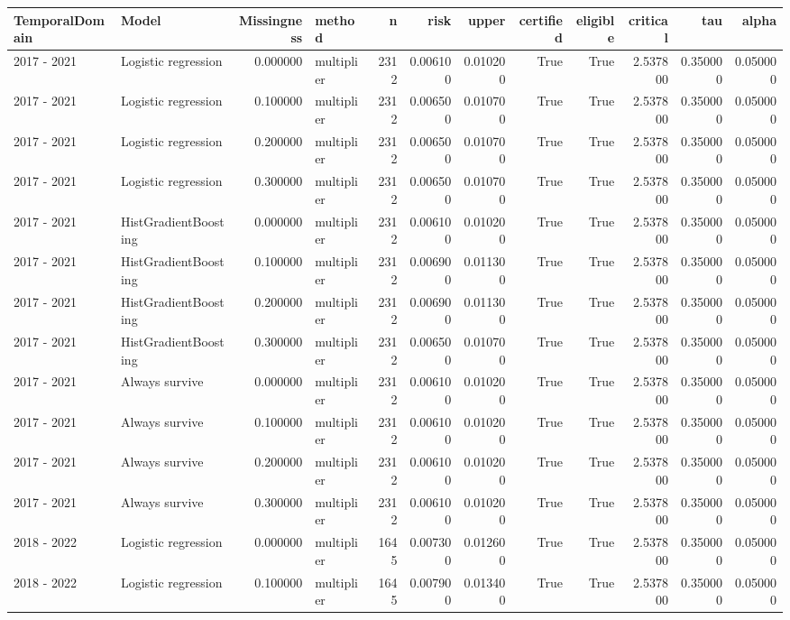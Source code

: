 \begin{tabular}{llrlrrrrrrrr}
\toprule
TemporalDomain & Model & Missingness & method & n & risk & upper & certified & eligible & critical & tau & alpha \\
\midrule
2017 - 2021 & Logistic regression & 0.000000 & multiplier & 2312 & 0.006100 & 0.010200 & True & True & 2.537800 & 0.350000 & 0.050000 \\
2017 - 2021 & Logistic regression & 0.100000 & multiplier & 2312 & 0.006500 & 0.010700 & True & True & 2.537800 & 0.350000 & 0.050000 \\
2017 - 2021 & Logistic regression & 0.200000 & multiplier & 2312 & 0.006500 & 0.010700 & True & True & 2.537800 & 0.350000 & 0.050000 \\
2017 - 2021 & Logistic regression & 0.300000 & multiplier & 2312 & 0.006500 & 0.010700 & True & True & 2.537800 & 0.350000 & 0.050000 \\
2017 - 2021 & HistGradientBoosting & 0.000000 & multiplier & 2312 & 0.006100 & 0.010200 & True & True & 2.537800 & 0.350000 & 0.050000 \\
2017 - 2021 & HistGradientBoosting & 0.100000 & multiplier & 2312 & 0.006900 & 0.011300 & True & True & 2.537800 & 0.350000 & 0.050000 \\
2017 - 2021 & HistGradientBoosting & 0.200000 & multiplier & 2312 & 0.006900 & 0.011300 & True & True & 2.537800 & 0.350000 & 0.050000 \\
2017 - 2021 & HistGradientBoosting & 0.300000 & multiplier & 2312 & 0.006500 & 0.010700 & True & True & 2.537800 & 0.350000 & 0.050000 \\
2017 - 2021 & Always survive & 0.000000 & multiplier & 2312 & 0.006100 & 0.010200 & True & True & 2.537800 & 0.350000 & 0.050000 \\
2017 - 2021 & Always survive & 0.100000 & multiplier & 2312 & 0.006100 & 0.010200 & True & True & 2.537800 & 0.350000 & 0.050000 \\
2017 - 2021 & Always survive & 0.200000 & multiplier & 2312 & 0.006100 & 0.010200 & True & True & 2.537800 & 0.350000 & 0.050000 \\
2017 - 2021 & Always survive & 0.300000 & multiplier & 2312 & 0.006100 & 0.010200 & True & True & 2.537800 & 0.350000 & 0.050000 \\
2018 - 2022 & Logistic regression & 0.000000 & multiplier & 1645 & 0.007300 & 0.012600 & True & True & 2.537800 & 0.350000 & 0.050000 \\
2018 - 2022 & Logistic regression & 0.100000 & multiplier & 1645 & 0.007900 & 0.013400 & True & True & 2.537800 & 0.350000 & 0.050000 \\

\end{tabular}

